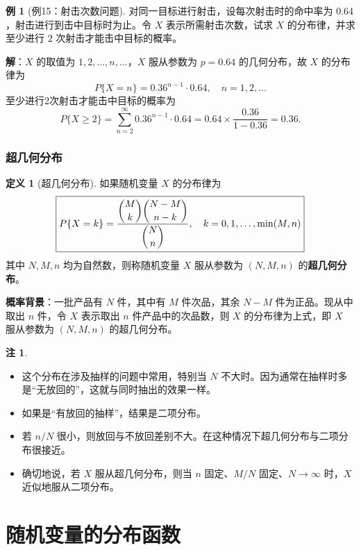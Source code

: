 \documentclass[11pt,a4paper]{report}
\theoremstyle{definition}
\newtheorem{definition}{定义}[chapter]
\newtheorem{example}{例}[chapter]
\newtheorem{note}{注}[chapter]
\begin{document}
\begin{example}[例15：射击次数问题]
对同一目标进行射击，设每次射击时的命中率为 $0.64$，射击进行到击中目标时为止。令 $X$ 表示所需射击次数，试求 $X$ 的分布律，并求至少进行 $2$ 次射击才能击中目标的概率。
\end{example}

\textbf{解}：$X$ 的取值为 $1,2,\dots,n,\dots$，$X$ 服从参数为 $p=0.64$ 的几何分布，故 $X$ 的分布律为
\[
P\{X=n\} = 0.36^{n-1} \cdot 0.64, \quad n=1,2,\dots
\]
至少进行2次射击才能击中目标的概率为
\[
P\{X \geq 2\} = \sum_{n=2}^{\infty} 0.36^{n-1} \cdot 0.64 = 0.64 \times \frac{0.36}{1-0.36} = \boxed{0.36}.
\]

\subsubsection{超几何分布}

\begin{definition}[超几何分布]
如果随机变量 $X$ 的分布律为
\[
\boxed{P\{X=k\} = \frac{\dbinom{M}{k}\dbinom{N-M}{n-k}}{\dbinom{N}{n}}, \quad k=0,1,\dots,\min(M,n)}
\]
其中 $N,M,n$ 均为自然数，则称随机变量 $X$ 服从参数为 $(N,M,n)$ 的\textbf{超几何分布}。
\end{definition}

\textbf{概率背景}：一批产品有 $N$ 件，其中有 $M$ 件次品，其余 $N-M$ 件为正品。现从中取出 $n$ 件，令 $X$ 表示取出 $n$ 件产品中的次品数，则 $X$ 的分布律为上式，即 $X$ 服从参数为 $(N,M,n)$ 的超几何分布。

\begin{note}
\begin{itemize}[leftmargin=2em]
    \item 这个分布在涉及抽样的问题中常用，特别当 $N$ 不大时。因为通常在抽样时多是``无放回的''，这就与同时抽出的效果一样。
    \item 如果是``有放回的抽样''，结果是二项分布。
    \item 若 $n/N$ 很小，则放回与不放回差别不大。在这种情况下超几何分布与二项分布很接近。
    \item 确切地说，若 $X$ 服从超几何分布，则当 $n$ 固定、$M/N$ 固定、$N \to \infty$ 时，$X$ 近似地服从二项分布。
\end{itemize}
\end{note}

\section{随机变量的分布函数}
\end{document}
